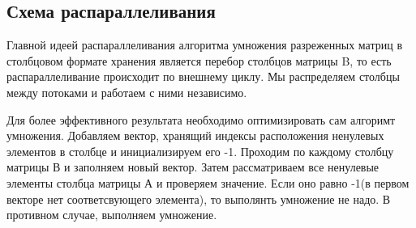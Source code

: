 \documentclass{report}
\begin{document}
\begin{center}
\section*{Схема распараллеливания}
\end{center}
\par Главной идеей распараллеливания алгоритма умножения разреженных матриц в столбцовом формате хранения является перебор столбцов матрицы B, то есть распараллеливание происходит по внешнему циклу. Мы распределяем столбцы между потоками и работаем с ними независимо.
\par Для более эффективного результата необходимо оптимизировать сам алгоримт умножения. Добавляем вектор, хранящий индексы расположения ненулевых элементов в столбце и инициализируем его -1.
Проходим по каждому столбцу матрицы В и заполняем новый вектор. Затем рассматриваем все ненулевые элементы столбца матрицы А и проверяем значение. Если оно равно -1(в первом векторе нет соответсвующего элемента), то выполянть умножение не надо. В противном случае, выполняем умножение.
\newpage
\end{document}

